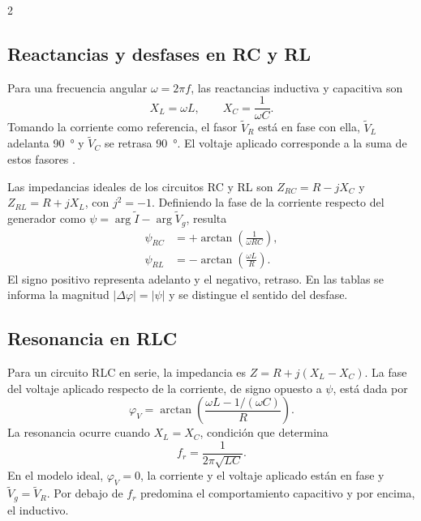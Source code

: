 \documentclass[10pt,letterpaper]{article}
\begin{document}
\begin{multicols}{2}
\subsection{Reactancias y desfases en RC y RL}

Para una frecuencia angular $\omega=2\pi f$, las reactancias inductiva y capacitiva son
\begin{equation}
  X_L=\omega L,\qquad X_C=\frac{1}{\omega C}.
  \label{eq:reactancias}
\end{equation}
Tomando la corriente como referencia, el fasor $\widetilde V_R$ está en fase con ella, $\widetilde V_L$ adelanta \SI{90}{\degree} y $\widetilde V_C$ se retrasa \SI{90}{\degree}. El voltaje aplicado corresponde a la suma de estos fasores \cite{young2009}.

Las impedancias ideales de los circuitos RC y RL son $Z_{RC}=R-jX_C$ y $Z_{RL}=R+jX_L$, con $j^2=-1$. Definiendo la fase de la corriente respecto del generador como $\psi=\arg\widetilde I-\arg\widetilde V_g$, resulta
\begin{align}
  \psi_{RC}&=+\arctan\!\left(\frac{1}{\omega RC}\right),
  \label{eq:rc}\\
  \psi_{RL}&=-\arctan\!\left(\frac{\omega L}{R}\right).
  \label{eq:rl}
\end{align}
El signo positivo representa adelanto y el negativo, retraso. En las tablas se informa la magnitud $|\Delta\varphi|=|\psi|$ y se distingue el sentido del desfase.

\subsection{Resonancia en RLC}

Para un circuito RLC en serie, la impedancia es $Z=R+j(X_L-X_C)$. La fase del voltaje aplicado respecto de la corriente, de signo opuesto a $\psi$, está dada por
\begin{equation}
  \varphi_V=\arctan\!\left(
  \frac{\omega L-1/(\omega C)}{R}
  \right).
  \label{eq:rlc}
\end{equation}
La resonancia ocurre cuando $X_L=X_C$, condición que determina
\begin{equation}
  f_r=\frac{1}{2\pi\sqrt{LC}}.
  \label{eq:resonancia}
\end{equation}
En el modelo ideal, $\varphi_V=0$, la corriente y el voltaje aplicado están en fase y $\widetilde V_g=\widetilde V_R$. Por debajo de $f_r$ predomina el comportamiento capacitivo y por encima, el inductivo.



\end{multicols}
\end{document}
